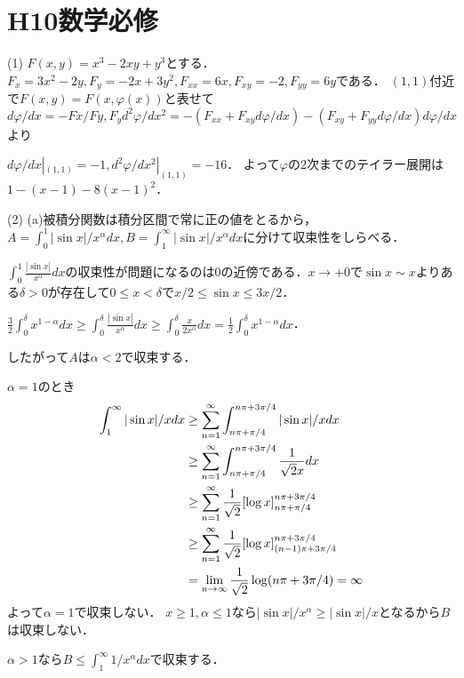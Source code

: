 \documentclass[
		book,
		head_space=20mm,
		foot_space=20mm,
		gutter=10mm,
		line_length=190mm
]{jlreq}
\begin{document}
\section{H10数学必修}
(1)
$F(x,y)=x^3-2xy+y^3$とする．
$F_x=3x^2-2y,F_y=-2x+3y^2,F_{xx}=6x,F_{xy}=-2,F_{yy}=6y$である．
$(1,1)$付近で$F(x,y)=F(x,\varphi(x))$と表せて
$d \varphi/dx=-Fx/Fy,F_yd^2\varphi/dx^2=-(F_{xx}+F_{xy}d\varphi/dx)-(F_{xy}+F_{yy}d\varphi/dx)d\varphi/dx$より

$d\varphi/dx|_{(1,1)}=-1,d^2\varphi/dx^2|_{(1,1)}=-16$．
よって$\varphi$の2次までのテイラー展開は$1-(x-1)-8(x-1)^2$．

(2)
(a)被積分関数は積分区間で常に正の値をとるから，$A=\int_0^1 |\sin x|/x^\alpha dx,B=\int_1^\infty |\sin x|/x^\alpha dx$に分けて収束性をしらべる．

$\int_{0}^1 \frac{|\sin x|}{x^{\alpha}} dx$の収束性が問題になるのは$0$の近傍である．$x\to +0$で$\sin x \sim x$よりある$\delta>0$が存在して$0\le x < \delta$で$x/2 \le \sin x \le 3x/2$．

$\frac{3}{2}\int_0^{\delta} x^{1-\alpha}dx \ge \int_0^{\delta} \frac{|\sin x|}{x^{\alpha}} dx \ge \int_0^{\delta} \frac{x}{2x^{\alpha}} dx=\frac{1}{2} \int_{0}^{\delta} x^{1-\alpha} dx$．

したがって$A$は$\alpha<2$で収束する．


$\alpha=1$のとき
\begin{align}
    \int_1^{\infty} |\sin x| /x dx &\ge \sum\limits_{n=1}^{\infty} \int_{n\pi+\pi/4}^{n\pi+3\pi/4} |\sin x| /x dx \\ 
    &\ge \sum_{n=1}^{\infty} \int_{n\pi+\pi/4}^{n\pi+3\pi/4} \frac{1}{\sqrt{2}x} dx \\
    &\ge \sum_{n=1}^{\infty} \frac{1}{\sqrt{2}}\qty[\log x]_{n\pi+\pi/4}^{n\pi+3\pi/4} \\
    &\ge \sum_{n=1}^{\infty} \frac{1}{\sqrt{2}}\qty[\log x]_{(n-1)\pi+3\pi/4}^{n\pi+3\pi/4} \\
    &= \lim_{n\to\infty} \frac{1}{\sqrt{2}}\log({n\pi+3\pi/4})=\infty\\
\end{align}
よって$\alpha=1$で収束しない．
$x\ge 1,\alpha\le 1$なら$|\sin x|/x^\alpha \ge |\sin x|/x$となるから$B$は収束しない．

$\alpha>1$なら$B \le \int_1^{\infty} 1/x^\alpha dx$で収束する．
\end{document}

